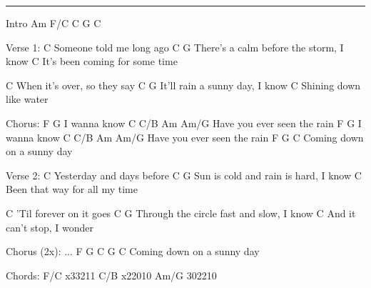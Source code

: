 \noindent\rule{\columnwidth}{1pt}

\begin{multicols}{2}
\begin{lstsong}
Intro
Am    F/C    C    G    C

Verse 1:
C
Someone told me long ago
C                                   G
There's a calm before the storm, I know
                   C
It's been coming for some time

C
When it's over, so they say
C                          G
It'll rain a sunny day, I know
                   C
Shining down like water

Chorus:
F         G
I wanna know
         C    C/B      Am    Am/G
Have you ever seen the rain
F         G
I wanna know
         C    C/B      Am    Am/G
Have you ever seen the rain
F        G               C
Coming down on a sunny day
\end{lstsong}\vfill\columnbreak\begin{lstsong}
Verse 2:
C
Yesterday and days before
C                                G
Sun is cold and rain is hard, I know
                    C
Been that way for all my time

C
'Til forever on it goes
C                                    G
Through the circle fast and slow, I know
                       C
And it can't stop, I wonder

Chorus (2x):
...
F        G                C     G    C
Coming down on a sunny day


Chords:
F/C    x33211
C/B    x22010
Am/G   302210
\end{lstsong}
\end{multicols}
\newpage
